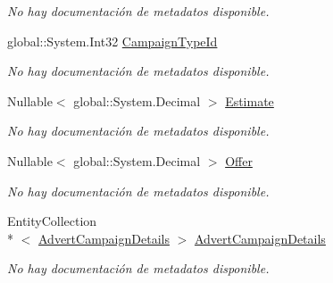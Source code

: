 \begin{DoxyCompactItemize}
\begin{DoxyCompactList}\small\item\em No hay documentación de metadatos disponible. \end{DoxyCompactList}\item 
global\-::\-System.\-Int32 \hyperlink{class_microsoft_1_1_samples_1_1_kinect_1_1_basic_interactions_1_1_advert_campaigns_a0f30bb2c401489f36a44244a2ccfdb02}{Campaign\-Type\-Id}
\begin{DoxyCompactList}\small\item\em No hay documentación de metadatos disponible. \end{DoxyCompactList}\item 
Nullable$<$ global\-::\-System.\-Decimal $>$ \hyperlink{class_microsoft_1_1_samples_1_1_kinect_1_1_basic_interactions_1_1_advert_campaigns_a76a56b713f0945b504bad85b90b8b50f}{Estimate}
\begin{DoxyCompactList}\small\item\em No hay documentación de metadatos disponible. \end{DoxyCompactList}\item 
Nullable$<$ global\-::\-System.\-Decimal $>$ \hyperlink{class_microsoft_1_1_samples_1_1_kinect_1_1_basic_interactions_1_1_advert_campaigns_a3b187f9be58904bc3c0d384b4f0f8c3c}{Offer}
\begin{DoxyCompactList}\small\item\em No hay documentación de metadatos disponible. \end{DoxyCompactList}\item 
Entity\-Collection\\*
$<$ \hyperlink{class_microsoft_1_1_samples_1_1_kinect_1_1_basic_interactions_1_1_advert_campaign_details}{Advert\-Campaign\-Details} $>$ \hyperlink{class_microsoft_1_1_samples_1_1_kinect_1_1_basic_interactions_1_1_advert_campaigns_aa0020384dc7f77733568a06d9d2c1fbe}{Advert\-Campaign\-Details}
\begin{DoxyCompactList}\small\item\em No hay documentación de metadatos disponible. \end{DoxyCompactList}\item 

\end{DoxyCompactItemize}
